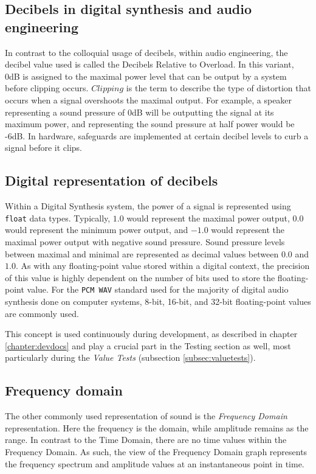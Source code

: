 \documentclass[a4paper,12pt]{report}
\begin{document}
\subsection{Decibels in digital synthesis and audio engineering}
\label{subsec:decibelindigitalsynthesis}
In contrast to the colloquial usage of decibels, within audio engineering, the decibel value used is called the Decibels Relative to Overload.  In this variant, 0dB is assigned to the maximal power level that can be output by a system before clipping occurs. $Clipping$ is the term to describe the type of distortion that occurs when a signal overshoots the maximal output. For example, a speaker representing a sound pressure of 0dB will be outputting the signal at its maximum power, and representing the sound pressure at half power would be -6dB. In hardware, safeguards are implemented at certain decibel levels to curb a signal before it clips.

\subsection{Digital representation of decibels}
\label{subsec:digitalrepdecibels}
Within a Digital Synthesis system, the power of a signal is represented using \texttt{float} data types. Typically, $1.0$ would represent the maximal power output, $0.0$ would represent the minimum power output, and $-1.0$ would represent the maximal power output with negative sound pressure. Sound pressure levels between maximal and minimal are represented as decimal values between $0.0$ and $1.0$. As with any floating-point value stored within a digital context, the precision of this value is highly dependent on the number of bits used to store the floating-point value. For the \texttt{PCM\ \-WAV} standard used for the majority of digital audio synthesis done on computer systems, 8-bit, 16-bit, and 32-bit floating-point values are commonly used.

This concept is used continuously during development, as described in chapter \ref{chapter:devdocs} and play a crucial part in the Testing section as well, most particularly during the \emph{Value Tests} (subsection \ref{subsec:valuetests}).

\subsection{Frequency domain}
\label{subsec:freqdomain}
The other commonly used representation of sound is the \emph{Frequency Domain} representation. Here the frequency is the domain, while amplitude remains as the range. In contrast to the Time Domain, there are no time values within the Frequency Domain. As such, the view of the Frequency Domain graph represents the frequency spectrum and amplitude values at an instantaneous point in time.
\end{document}
